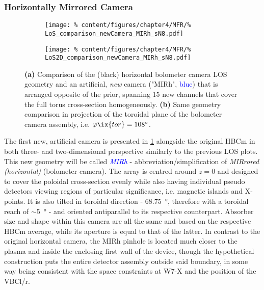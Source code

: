            \subsubsection*{Horizontally Mirrored Camera}%
%
                \begin{figure}[t]%
                    \centering%
                    \begin{subfigure}{0.4\textwidth}%
                        \texttt{[image: \%
                            content/figures/chapter4/MFR/\%
                            LoS\_comparison\_newCamera\_MIRh\_sN8.pdf]}%
                        \caption{}%
                    \end{subfigure}%
                    \hspace*{0.5cm}%
                    \begin{subfigure}{0.5\textwidth}%
                        \texttt{[image: \%
                            content/figures/chapter4/MFR/\%
                            LoS2D\_comparison\_newCamera\_MIRh\_sN8.pdf]}%
                        \caption{}%
                    \end{subfigure}%
                    \caption{\textbf{(a)} Comparison of the (black) horizontal bolometer camera LOS geometry and an artificial, \textit{new} camera ("MIRh", \textcolor{blue}{blue}) that is arranged opposite of the prior, spanning 15 new channels that cover the full torus cross-section homogeneously. \textbf{(b)} Same geometry comparison in projection of the toroidal plane of the bolometer camera assembly, i.e. $\varphi\ix{tor}=108^{\circ}$.}\label{fig:geometry_newcam_mirh}%
                \end{figure}%
                The first new, artificial camera is presented in \cref{fig:geometry_newcam_mirh} alongside the original HBCm in both three- and two-dimensional perspective similarly to the previous LOS plots. This new geometry will be called \textit{\textcolor{blue}{MIRh}} - abbreviation/simplification of \textit{MIRrored (horizontal)} (bolometer camera). The array is centred around $z=0$ and designed to cover the poloidal cross-section evenly while also having individual pseudo detectors viewing regions of particular significance, i.e. magnetic islands and X-points. It is also tilted in toroidal direction  - \SI{68.75}{\degree}, therefore with a toroidal reach of $\sim$\SI{5}{\degree} - and oriented antiparallel to its respective counterpart. Absorber size and shape within this camera are all the same and based on the respective HBCm average, while its aperture is equal to that of the latter. In contrast to the original horizontal camera, the MIRh pinhole is located much closer to the plasma and inside the enclosing first wall of the device, though the hypothetical construction puts the entire detector assembly outside said boundary, in some way being consistent with the space constraints at W7-X and the position of the VBCl/r.\\%
